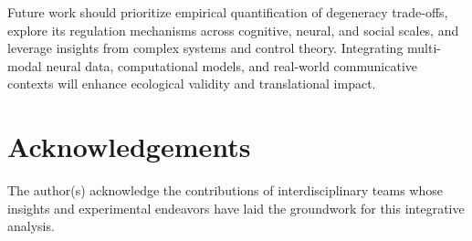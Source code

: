 \documentclass[12pt,a4paper]{article}
\begin{document}
Future work should prioritize empirical quantification of degeneracy trade-offs, explore its regulation mechanisms across cognitive, neural, and social scales, and leverage insights from complex systems and control theory. Integrating multi-modal neural data, computational models, and real-world communicative contexts will enhance ecological validity and translational impact.

\section*{Acknowledgements}
The author(s) acknowledge the contributions of interdisciplinary teams whose insights and experimental endeavors have laid the groundwork for this integrative analysis.



\end{document}
